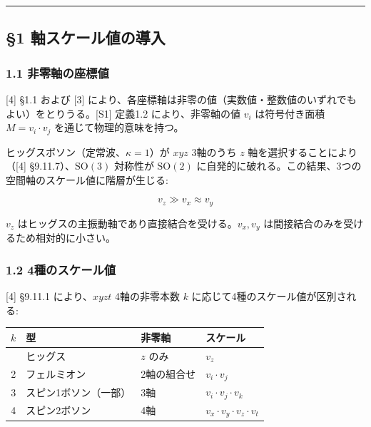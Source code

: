 \documentclass[
  a4paper,11pt]{ltjsarticle}
\newcounter{none} %
\begin{document}
\begin{center}\rule{0.5\linewidth}{0.5pt}\end{center}

\subsection{§1
軸スケール値の導入}\label{ux8ef8ux30b9ux30b1ux30fcux30ebux5024ux306eux5c0eux5165}

\subsubsection{1.1
非零軸の座標値}\label{ux975eux96f6ux8ef8ux306eux5ea7ux6a19ux5024}

{[}4{]} §1.1 および {[}3{]}
により、各座標軸は非零の値（実数値・整数値のいずれでもよい）をとりうる。{[}S1{]}
定義1.2 により、非零軸の値 \(v_i\) は符号付き面積 \(M = v_i \cdot v_j\)
を通じて物理的意味を持つ。

ヒッグスボソン（定常波、\(\kappa = 1\)）が \(xyz\) 3軸のうち \(z\)
軸を選択することにより（{[}4{]} §9.11.7）、\(\mathrm{SO}(3)\) 対称性が
\(\mathrm{SO}(2)\)
に自発的に破れる。この結果、3つの空間軸のスケール値に階層が生じる:

\[v_z \gg v_x \approx v_y\]

\(v_z\) はヒッグスの主振動軸であり直接結合を受ける。\(v_x, v_y\)
は間接結合のみを受けるため相対的に小さい。

\subsubsection{1.2
4種のスケール値}\label{ux7a2eux306eux30b9ux30b1ux30fcux30ebux5024}

{[}4{]} §9.11.1 により、\(xyzt\) 4軸の非零本数 \(k\)
に応じて4種のスケール値が区別される:

{\def\LTcaptype{none} %
\begin{longtable}[]{@{}clll@{}}
\toprule\noalign{}
\(k\) & 型 & 非零軸 & スケール \\
\midrule\noalign{}
\endhead
\bottomrule\noalign{}
\endlastfoot
1 & ヒッグス & \(z\) のみ & \(v_z\) \\
2 & フェルミオン & 2軸の組合せ & \(v_i \cdot v_j\) \\
3 & スピン1ボソン（一部） & 3軸 & \(v_i \cdot v_j \cdot v_k\) \\
4 & スピン2ボソン & 4軸 & \(v_x \cdot v_y \cdot v_z \cdot v_t\) \\
\end{longtable}
}
\end{document}
